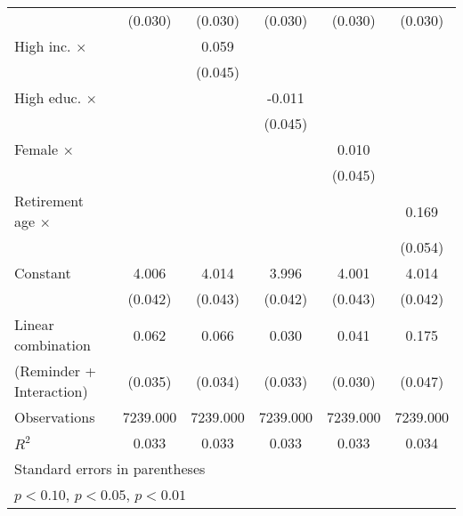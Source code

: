 {\begin{tabular}{l*{5}{c}}
                    &     (0.030)         &     (0.030)         &     (0.030)         &     (0.030)         &     (0.030)         \\
\addlinespace
High inc. $\times$  &                     &       0.059         &                     &                     &                     \\
                    &                     &     (0.045)         &                     &                     &                     \\
\addlinespace
High educ. $\times$ &                     &                     &      -0.011         &                     &                     \\
                    &                     &                     &     (0.045)         &                     &                     \\
\addlinespace
Female $\times$     &                     &                     &                     &       0.010         &                     \\
                    &                     &                     &                     &     (0.045)         &                     \\
\addlinespace
Retirement age $\times$&                     &                     &                     &                     &       0.169\sym{***}\\
                    &                     &                     &                     &                     &     (0.054)         \\
\addlinespace
Constant            &       4.006\sym{***}&       4.014\sym{***}&       3.996\sym{***}&       4.001\sym{***}&       4.014\sym{***}\\
                    &     (0.042)         &     (0.043)         &     (0.042)         &     (0.043)         &     (0.042)         \\
\midrule
Linear combination  &       0.062         &       0.066         &       0.030         &       0.041         &       0.175         \\
(Reminder + Interaction)&     (0.035)         &     (0.034)         &     (0.033)         &     (0.030)         &     (0.047)         \\
Observations        &    7239.000         &    7239.000         &    7239.000         &    7239.000         &    7239.000         \\
\(R^{2}\)           &       0.033         &       0.033         &       0.033         &       0.033         &       0.034         \\
\bottomrule
\multicolumn{6}{l}{\footnotesize Standard errors in parentheses}\\
\multicolumn{6}{l}{\footnotesize \sym{*} \(p<0.10\), \sym{**} \(p<0.05\), \sym{***} \(p<0.01\)}\\
\end{tabular}
}
